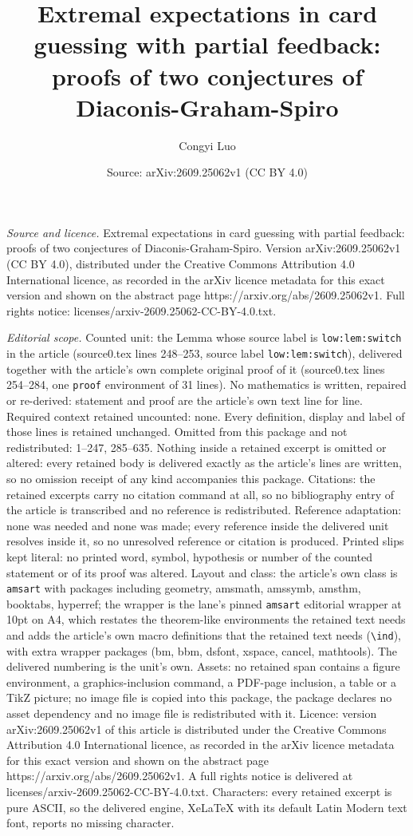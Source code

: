 \documentclass[10pt,a4paper]{amsart}
\title[Extremal expectations in card guessing with partial feedback]{Extremal expectations in card guessing with partial feedback: proofs of two conjectures of Diaconis-Graham-Spiro}
\author{Congyi Luo}
\date{Source: arXiv:2609.25062v1 (CC BY 4.0)}
\begin{document}
\maketitle

\noindent\emph{Source and licence.} Extremal expectations in card guessing with partial feedback: proofs of two conjectures of Diaconis-Graham-Spiro. Version arXiv:2609.25062v1 (CC BY 4.0), distributed under the Creative Commons Attribution 4.0 International licence, as recorded in the arXiv licence metadata for this exact version and shown on the abstract page https://arxiv.org/abs/2609.25062v1. Full rights notice: licenses/arxiv-2609.25062-CC-BY-4.0.txt.\par\smallskip

\noindent\textit{Editorial scope.} Counted unit: the Lemma whose source label is \texttt{low:lem:switch} in the article (source0.tex lines 248--253, source label \texttt{low:lem:switch}), delivered together with the article's own complete original proof of it (source0.tex lines 254--284, one \texttt{proof} environment of 31 lines). No mathematics is written, repaired or re-derived: statement and proof are the article's own text line for line. Required context retained uncounted: none. Every definition, display and label of those lines is retained unchanged. Omitted from this package and not redistributed: 1--247, 285--635. Nothing inside a retained excerpt is omitted or altered: every retained body is delivered exactly as the article's lines are written, so no omission receipt of any kind accompanies this package. Citations: the retained excerpts carry no citation command at all, so no bibliography entry of the article is transcribed and no reference is redistributed. Reference adaptation: none was needed and none was made; every reference inside the delivered unit resolves inside it, so no unresolved reference or citation is produced. Printed slips kept literal: no printed word, symbol, hypothesis or number of the counted statement or of its proof was altered. Layout and class: the article's own class is \texttt{amsart} with packages including geometry, amsmath, amssymb, amsthm, booktabs, hyperref; the wrapper is the lane's pinned \texttt{amsart} editorial wrapper at 10pt on A4, which restates the theorem-like environments the retained text needs and adds the article's own macro definitions that the retained text needs (\texttt{\textbackslash ind}), with extra wrapper packages (bm, bbm, dsfont, xspace, cancel, mathtools). The delivered numbering is the unit's own. Assets: no retained span contains a figure environment, a graphics-inclusion command, a PDF-page inclusion, a table or a TikZ picture; no image file is copied into this package, the package declares no asset dependency and no image file is redistributed with it. Licence: version arXiv:2609.25062v1 of this article is distributed under the Creative Commons Attribution 4.0 International licence, as recorded in the arXiv licence metadata for this exact version and shown on the abstract page https://arxiv.org/abs/2609.25062v1. A full rights notice is delivered at licenses/arxiv-2609.25062-CC-BY-4.0.txt. Characters: every retained excerpt is pure ASCII, so the delivered engine, XeLaTeX with its default Latin Modern text font, reports no missing character.
\end{document}
